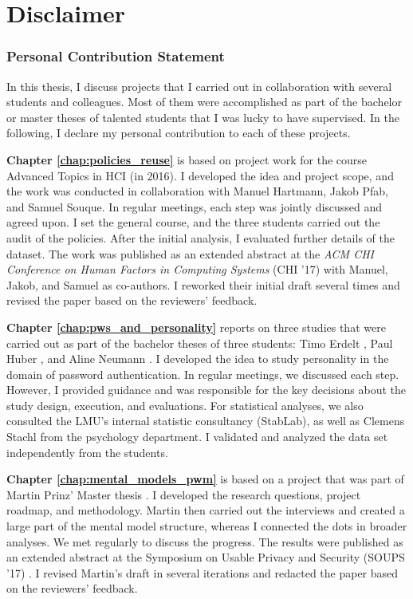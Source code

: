 
\section*{Disclaimer}

\subsubsection{Personal Contribution Statement}
In this thesis, I discuss projects that I carried out in collaboration with several students and colleagues. Most of them were accomplished as part of the bachelor or master theses of talented students that I was lucky to have supervised. In the following, I declare my personal contribution to each of these projects. 

\textbf{Chapter \ref{chap:policies_reuse}} is based on project work for the course Advanced Topics in HCI (in 2016). I developed the idea and project scope, and the work was conducted in collaboration with Manuel Hartmann, Jakob Pfab, and Samuel Souque. In regular meetings, each step was jointly discussed and agreed upon. I set the general course, and the three students carried out the audit of the policies. After the initial analysis, I evaluated further details of the dataset. The work was published as an extended abstract at the \textit{ACM CHI Conference on Human Factors in Computing Systems} (CHI '17) \cite{Seitz2017PoliciesReuse} with Manuel, Jakob, and Samuel as co-authors. I reworked their initial draft several times and revised the paper based on the reviewers' feedback. 

\textbf{Chapter \ref{chap:pws_and_personality}} reports on three studies that were carried out as part of the bachelor theses of three students: Timo Erdelt \cite{Erdelt2017BA}, Paul Huber \cite{Huber2016BA}, and Aline Neumann \cite{Neumann2017BA}. I developed the idea to study personality in the domain of password authentication. In regular meetings, we discussed each step. However, I provided guidance and was responsible for the key decisions about the study design, execution, and evaluations. For statistical analyses, we also consulted the LMU's internal statistic consultancy (StabLab), as well as Clemens Stachl from the psychology department. I validated and analyzed the data set independently from the students.

\textbf{Chapter \ref{chap:mental_models_pwm}} is based on a project that was part of Martin Prinz' Master thesis \cite{Prinz2017Thesis}. I developed the research questions, project roadmap, and methodology. Martin then carried out the interviews and created a large part of the mental model structure, whereas I connected the dots in broader analyses. We met regularly to discuss the progress. The results were published as an extended abstract at the Symposium on Usable Privacy and Security (SOUPS '17) \cite{Prinz2017MentalModel}. I revised Martin's draft in several iterations and redacted the paper based on the reviewers' feedback. 

